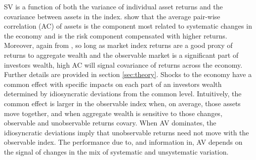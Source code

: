 SV is a function of both the variance of individual asset returns and the covariance between assets in the index. \citet{pollet_average_2010} show that the average pair-wise correlation (AC) of assets is the component most related to systematic changes in the economy and is the risk component compensated with higher returns. Moreover, again from \citet{pollet_average_2010}, so long as market index returns are a good proxy of returns to aggregate wealth and the observable market is a significant part of investors wealth, high AC will signal covariance of returns across the economy. Further details are provided in section \ref{sec:theory}. Shocks to the economy have a common effect with specific impacts on each part of an investors wealth determined by idiosyncratic deviations from the common level. Intuitively, the common effect is larger in the observable index when, on average, those assets move together, and when aggregate wealth is sensitive to those changes, observable and unobservable returns covary. When AV dominates, the idiosyncratic deviations imply that unobservable returns need not move with the observable index. The performance due to, and information in, AV depends on the signal of changes in the mix of systematic and unsystematic variation. %

